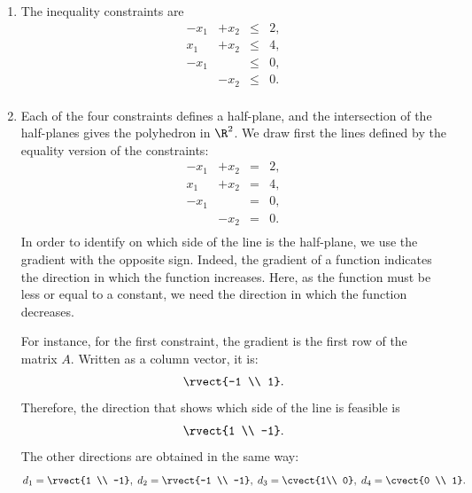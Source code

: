 
\begin{enumerate}
\item The inequality constraints are
  \[
  \begin{array}{rrcl}
    - x_1 & + x_2 &\leq& 2, \\
     x_1 & + x_2 &\leq& 4, \\
    - x_1 &    &\leq& 0, \\
           & - x_2 &\leq& 0. \\
  \end{array}
  \]
\item 
  Each of the four constraints defines a half-plane, and the
  intersection of the half-planes gives the polyhedron in $\R^2$. We
  draw first the lines defined by the equality version of the
  constraints: 
  \[
  \begin{array}{rrcl}
    - x_1 & + x_2 &=& 2, \\
     x_1 & + x_2 &=& 4, \\
    - x_1 &    &=& 0, \\
           & - x_2 &=& 0. \\
  \end{array}
  \]
  In order to identify on which side of the line is the half-plane, we
  use the gradient with the opposite sign. Indeed, the gradient of a
  function indicates the direction in which the function
  increases. Here, as the function must be less or equal to a
  constant, we need the direction in which the function decreases.

  For instance, for the first constraint, the gradient is the first
  row of the matrix $A$. Written as a column vector, it is:
  \[
\rvect{-1 \\ 1}.
\]
Therefore, the direction that shows which side of the line is feasible is
  \[
\rvect{1 \\ -1}.
\]
The other directions are obtained in the same way:
\[
d_1 = \rvect{1 \\ -1}, \; d_2 = \rvect{-1 \\ -1}, \; d_3 =
\cvect{1\\ 0}, \; d_4 = \cvect{0 \\ 1}.
\]


\end{enumerate}
